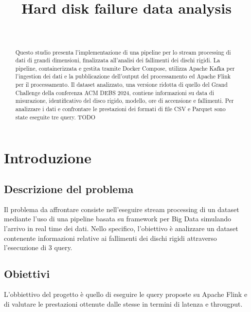 \documentclass[conference]{IEEEtran}
\begin{document}
\title{Hard disk failure data analysis\\}

\author{
\and
{}
\\
}


\maketitle
\thispagestyle{plain}
\pagestyle{plain}

\begin{abstract}
    Questo studio presenta l'implementazione di una pipeline per lo stream processing di dati di grandi dimensioni, finalizzata all'analisi dei fallimenti dei dischi rigidi. La pipeline, containerizzata e gestita tramite Docker Compose, utilizza Apache Kafka per l'ingestion dei dati e la pubblicazione dell'output del processamento ed Apache Flink per il processamento. Il dataset analizzato, una versione ridotta di quello del Grand Challenge della conferenza ACM DEBS 2024, contiene informazioni su data di misurazione, identificativo del disco rigido, modello, ore di accensione e fallimenti. Per analizzare i dati e confrontare le prestazioni dei formati di file CSV e Parquet sono state eseguite tre query. TODO
\end{abstract}

\section{Introduzione}
\subsection{Descrizione del problema}
Il problema da affrontare consiste nell'eseguire stream processing di un dataset mediante l'uso di una pipeline basata su framework per Big Data simulando l'arrivo in real time dei dati. Nello specifico, l'obiettivo è analizzare un dataset contenente informazioni relative ai fallimenti dei dischi rigidi attraverso l'esecuzione di 3 query.
\subsection{Obiettivi}
L'obbiettivo del progetto è quello di eseguire le query proposte su Apache Flink e di valutare le prestazioni ottenute dalle stesse in termini di latenza e througput.
\end{document}
